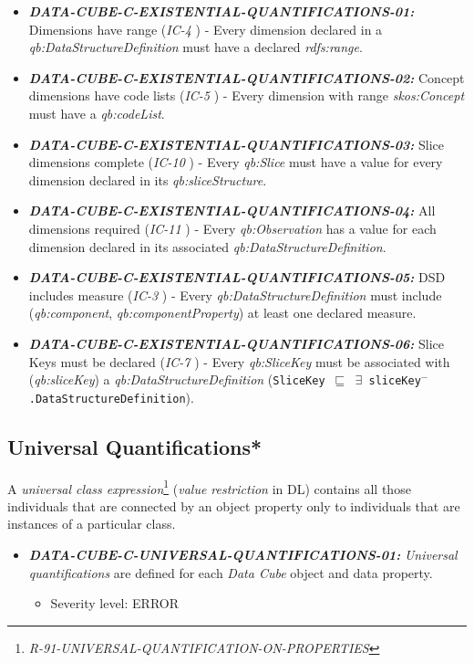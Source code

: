 \documentclass{llncs}
\newcommand{\ms}[1]{\texttt{#1}}
\begin{document}
\begin{itemize}
	\item \textbf{{\em DATA-CUBE-C-EXISTENTIAL-QUANTIFICATIONS-01:}}
	Dimensions have range (\emph{IC-4} \cite{CyganiakReynolds2014}) - 
	Every dimension declared in a \emph{qb:DataStructureDefinition} must have a declared \emph{rdfs:range}. 
	\item \textbf{{\em DATA-CUBE-C-EXISTENTIAL-QUANTIFICATIONS-02:}}
	Concept dimensions have code lists (\emph{IC-5} \cite{CyganiakReynolds2014}) - 
	Every dimension with range \emph{skos:Concept} must have a \emph{qb:codeList}. 
	\item \textbf{{\em DATA-CUBE-C-EXISTENTIAL-QUANTIFICATIONS-03:}} 
	Slice dimensions complete (\emph{IC-10} \cite{CyganiakReynolds2014}) - 
	Every \emph{qb:Slice} must have a value for every dimension declared in its \emph{qb:sliceStructure}. 
	\item \textbf{{\em DATA-CUBE-C-EXISTENTIAL-QUANTIFICATIONS-04:}}
	All dimensions required (\emph{IC-11} \cite{CyganiakReynolds2014}) - 
	Every \emph{qb:Observation} has a value for each dimension declared in its associated \emph{qb:DataStructureDefinition}. 
  \item \textbf{{\em DATA-CUBE-C-EXISTENTIAL-QUANTIFICATIONS-05:}}
	DSD includes measure (\emph{IC-3} \cite{CyganiakReynolds2014}) -  
	Every \emph{qb:DataStructureDefinition} must include (\emph{qb:component}, \emph{qb:componentProperty}) at least one declared measure. 
	\item \textbf{{\em DATA-CUBE-C-EXISTENTIAL-QUANTIFICATIONS-06:}}
	Slice Keys must be declared (\emph{IC-7} \cite{CyganiakReynolds2014}) -
	Every \emph{qb:SliceKey} must be associated with (\emph{qb:sliceKey}) a \emph{qb:DataStructureDefinition} (\ms{SliceKey $\sqsubseteq$ $\exists$ sliceKey$^{-}$.DataStructureDefinition}). 
\end{itemize}

\subsection{Universal Quantifications*}

A \emph{universal class expression}\footnote{{\em R-91-UNIVERSAL-QUANTIFICATION-ON-PROPERTIES}} ({\em value restriction} in DL) contains all those individuals that are connected by an object property only to individuals that are instances of a particular class.

\begin{itemize}
	\item \textbf{{\em DATA-CUBE-C-UNIVERSAL-QUANTIFICATIONS-01:}}
	\emph{Universal quantifications} are defined for each \emph{Data Cube} object and data property.
	\begin{itemize}
		\item Severity level: ERROR
	\end{itemize}
\end{itemize}
\end{document}
